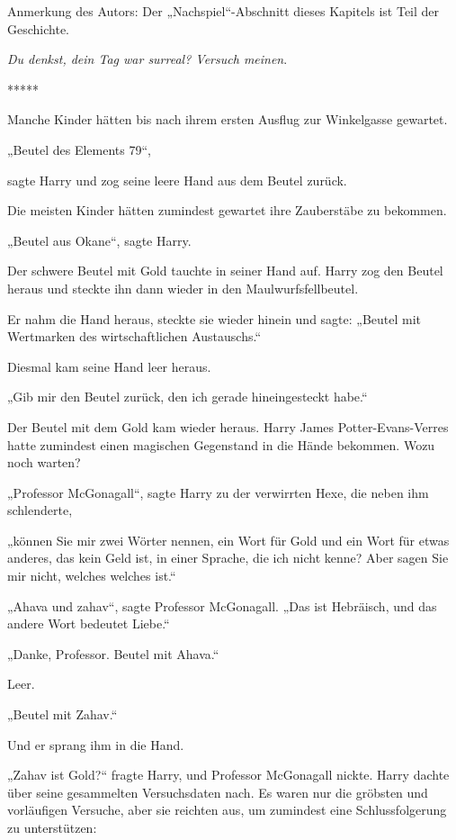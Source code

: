 

\hypertarget{der-planungsirrtum}{%

Anmerkung des Autors: Der „Nachspiel“-Abschnitt dieses Kapitels ist Teil der Geschichte.

\emph{Du denkst, dein Tag war surreal? Versuch meinen}.

*****

Manche Kinder hätten bis nach ihrem ersten Ausflug zur Winkelgasse gewartet.

„Beutel des Elements 79“,

sagte Harry und zog seine leere Hand aus dem Beutel zurück.

Die meisten Kinder hätten zumindest gewartet ihre Zauberstäbe zu bekommen.

„Beutel aus Okane“, sagte Harry.

Der schwere Beutel mit Gold tauchte in seiner Hand auf. Harry zog den Beutel heraus und steckte ihn dann wieder in den Maulwurfsfellbeutel.

Er nahm die Hand heraus, steckte sie wieder hinein und sagte: „Beutel mit Wertmarken des wirtschaftlichen Austauschs.“

Diesmal kam seine Hand leer heraus.

„Gib mir den Beutel zurück, den ich gerade hineingesteckt habe.“

Der Beutel mit dem Gold kam wieder heraus. Harry James Potter-Evans-Verres hatte zumindest einen magischen Gegenstand in die Hände bekommen. Wozu noch warten?

„Professor McGonagall“, sagte Harry zu der verwirrten Hexe, die neben ihm schlenderte,

„können Sie mir zwei Wörter nennen, ein Wort für Gold und ein Wort für etwas anderes, das kein Geld ist, in einer Sprache, die ich nicht kenne? Aber sagen Sie mir nicht, welches welches ist.“

„Ahava und zahav“, sagte Professor McGonagall. „Das ist Hebräisch, und das andere Wort bedeutet Liebe.“

„Danke, Professor. Beutel mit Ahava.“

Leer.

„Beutel mit Zahav.“

Und er sprang ihm in die Hand.

„Zahav ist Gold?“ fragte Harry, und Professor McGonagall nickte. Harry dachte über seine gesammelten Versuchsdaten nach. Es waren nur die gröbsten und vorläufigen Versuche, aber sie reichten aus, um zumindest eine Schlussfolgerung zu unterstützen:

}
